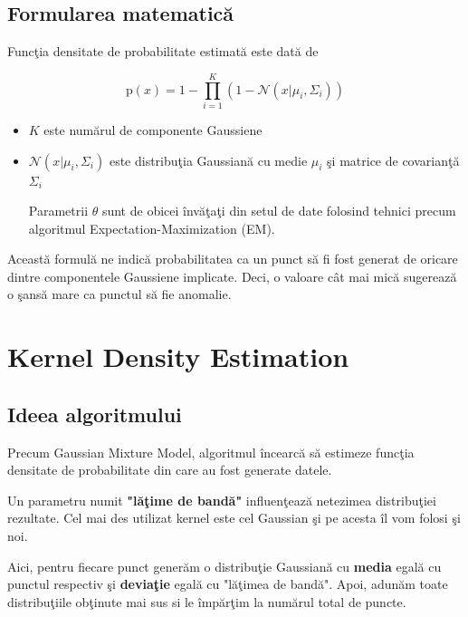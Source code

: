 \subsection{Formularea matematică}

Funcţia densitate de probabilitate estimată este dată de 

\begin{equation}
    \text{p}(x) = 1 - \prod_{i=1}^{K} \left(1 - \mathcal{N}(x|\mu_i, \Sigma_i)\right)
\end{equation}
    
\begin{itemize}
    \item $K$ este numărul de componente Gaussiene
    \item $\mathcal{N}(x | \mu_i, \Sigma_i)$ este distribuţia Gaussiană
    cu medie $\mu_i$ şi matrice de covarianţă $\Sigma_i$

Parametrii $\theta$ sunt de obicei învăţaţi din setul de date folosind 
tehnici precum algoritmul Expectation-Maximization (EM).
\end{itemize}

Această formulă ne indică probabilitatea ca un punct să fi fost generat de oricare 
dintre componentele Gaussiene implicate. Deci, o valoare cât mai mică sugerează 
o şansă mare ca punctul să fie anomalie.

\section{Kernel Density Estimation}

\subsection{Ideea algoritmului}

Precum Gaussian Mixture Model, algoritmul încearcă să estimeze 
funcţia densitate de probabilitate din care au fost generate datele.

Un parametru numit \textbf{"lăţime de bandă"} influenţează netezimea distribuţiei 
rezultate.
Cel mai des utilizat kernel este cel Gaussian şi pe acesta îl vom folosi şi noi.

Aici, pentru fiecare punct generăm o distribuţie Gaussiană cu \textbf{media} egală
cu punctul respectiv şi \textbf{deviaţie} egală cu "lăţimea de bandă". Apoi, adunăm toate 
distribuţiile obţinute mai sus si le împărţim la numărul total de puncte.

